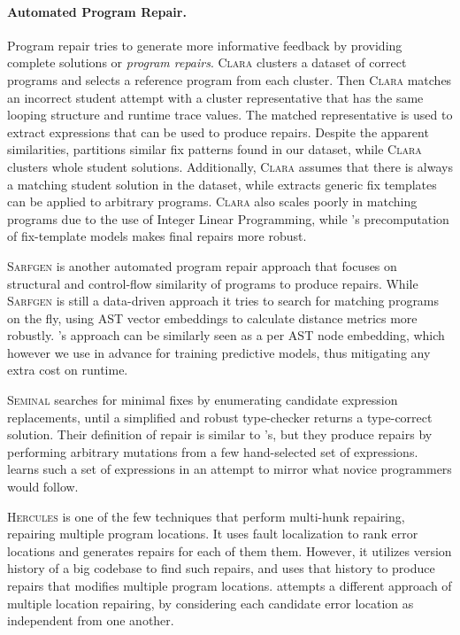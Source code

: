 \paragraph{Automated Program Repair.} Program repair tries to generate more
informative feedback by providing complete solutions or \emph{program repairs}.
\textsc{Clara} \citep{Gulwani_2018} clusters a dataset of correct programs and
selects a reference program from each cluster. Then \textsc{Clara} matches an
incorrect student attempt with a cluster representative that has the same
looping structure and runtime trace values. The matched representative is used
to extract expressions that can be used to produce repairs. Despite the apparent
similarities, \toolname partitions similar fix patterns found in our dataset,
while \textsc{Clara} clusters whole student solutions. Additionally,
\textsc{Clara} assumes that there is always a matching student solution in the
dataset, while \toolname extracts generic fix templates can be applied to
arbitrary programs. \textsc{Clara} also scales poorly in matching programs due
to the use of Integer Linear Programming, while \toolname's precomputation of
fix-template models makes final repairs more robust.

\textsc{Sarfgen} \citep{Wang_2018} is another automated program repair approach
that focuses on structural and control-flow similarity of programs to produce
repairs. While \textsc{Sarfgen} is still a data-driven approach it tries to
search for matching programs on the fly, using AST vector embeddings to
calculate distance metrics more robustly. \toolname's approach can be similarly
seen as a per AST node embedding, which however we use in advance for training
predictive models, thus mitigating any extra cost on runtime.

\textsc{Seminal} \citep{Lerner2007-dt} searches for minimal fixes by enumerating
candidate expression replacements, until a simplified and robust type-checker
returns a type-correct solution. Their definition of repair is similar to
\toolname's, but they produce repairs by performing arbitrary mutations from a
few hand-selected set of expressions. \toolname learns such a set of expressions
in an attempt to mirror what novice programmers would follow.

\textsc{Hercules} \citep{Saha_2019} is one of the few techniques that perform
multi-hunk repairing, \ie repairing multiple program locations. It uses fault
localization to rank error locations and generates repairs for each of them
them. However, it utilizes version history of a big codebase to find such
repairs, and uses that history to produce repairs that modifies multiple program
locations. \toolname attempts a different approach of multiple location
repairing, by considering each candidate error location as independent from one
another.
